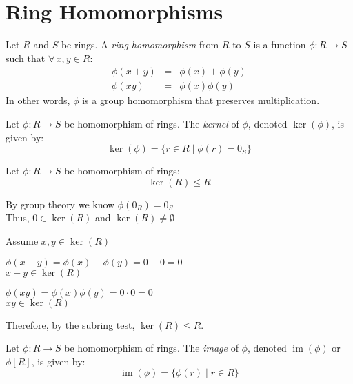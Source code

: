 \documentclass[letterpaper,12pt,fleqn]{article}
\DeclareMathOperator{\im}{im}
\begin{document}
\section*{Ring Homomorphisms}

\begin{definition}
  Let $R$ and $S$ be rings. A \emph{ring homomorphism} from $R$ to $S$ is a function
  $\phi:R\to S$ such that $\forall\,x,y\in R$:
  \begin{eqnarray*}
    \phi(x+y) &=& \phi(x)+\phi(y) \\
    \phi(xy) &=& \phi(x)\phi(y)
  \end{eqnarray*}
  In other words, $\phi$ is a group homomorphism that preserves multiplication.
\end{definition}

\begin{definition}[Kernel]
  Let $\phi:R\to S$ be homomorphism of rings. The \emph{kernel} of $\phi$, denoted
  $\ker(\phi)$, is given by:
  \[\ker(\phi)=\{r\in R\mid\phi(r)=0_S\}\]
\end{definition}

\begin{theorem}
  Let $\phi:R\to S$ be homomorphism of rings:
  \[\ker(R)\le R\]
\end{theorem}

\begin{theproof}
  By group theory we know $\phi(0_R)=0_S$ \\
  Thus, $0\in\ker(R)$ and $\ker(R)\ne\emptyset$

  Assume $x,y\in\ker(R)$

  $\phi(x-y)=\phi(x)-\phi(y)=0-0=0$ \\
  $x-y\in\ker(R)$

  $\phi(xy)=\phi(x)\phi(y)=0\cdot0=0$ \\
  $xy\in\ker(R)$

  Therefore, by the subring test, $\ker(R)\le R$.
\end{theproof}

\begin{definition}[Kernel]
  Let $\phi:R\to S$ be homomorphism of rings. The \emph{image} of $\phi$, denoted
  $\im(\phi)$ or $\phi[R]$, is given by:
  \[\im(\phi)=\{\phi(r)\mid r\in R\}\]
\end{definition}
\end{document}
